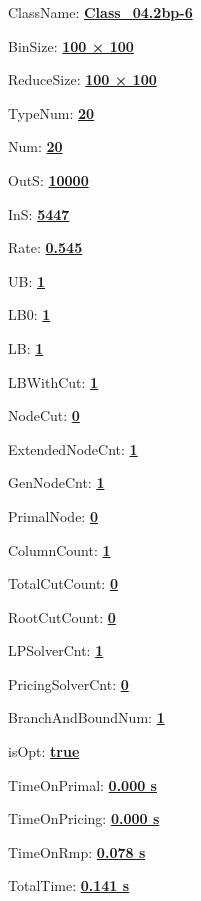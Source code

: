 \documentclass[11pt]{article}
\begin{document}
\pagestyle{empty}


ClassName: \underline{\textbf{Class_04.2bp-6}}
\par
BinSize: \underline{\textbf{100 × 100}}
\par
ReduceSize: \underline{\textbf{100 × 100}}
\par
TypeNum: \underline{\textbf{20}}
\par
Num: \underline{\textbf{20}}
\par
OutS: \underline{\textbf{10000}}
\par
InS: \underline{\textbf{5447}}
\par
Rate: \underline{\textbf{0.545}}
\par
UB: \underline{\textbf{1}}
\par
LB0: \underline{\textbf{1}}
\par
LB: \underline{\textbf{1}}
\par
LBWithCut: \underline{\textbf{1}}
\par
NodeCut: \underline{\textbf{0}}
\par
ExtendedNodeCnt: \underline{\textbf{1}}
\par
GenNodeCnt: \underline{\textbf{1}}
\par
PrimalNode: \underline{\textbf{0}}
\par
ColumnCount: \underline{\textbf{1}}
\par
TotalCutCount: \underline{\textbf{0}}
\par
RootCutCount: \underline{\textbf{0}}
\par
LPSolverCnt: \underline{\textbf{1}}
\par
PricingSolverCnt: \underline{\textbf{0}}
\par
BranchAndBoundNum: \underline{\textbf{1}}
\par
isOpt: \underline{\textbf{true}}
\par
TimeOnPrimal: \underline{\textbf{0.000 s}}
\par
TimeOnPricing: \underline{\textbf{0.000 s}}
\par
TimeOnRmp: \underline{\textbf{0.078 s}}
\par
TotalTime: \underline{\textbf{0.141 s}}
\par
\newpage
\end{document}
